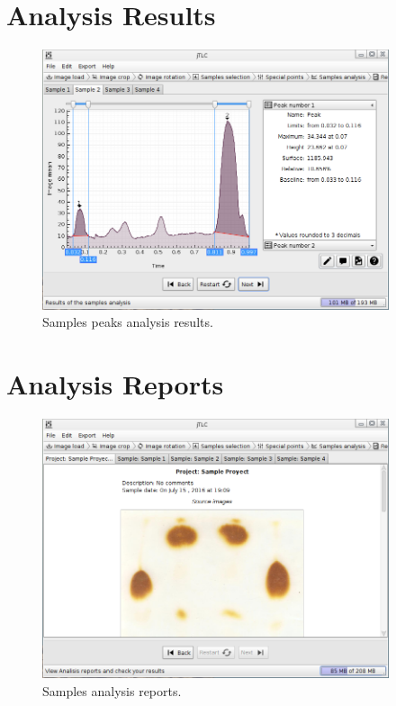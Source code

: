 \section{Analysis Results}
\begin{figure}[H]
	\vspace{0cm}
	\centering
	\includegraphics[width=385px]{imagenes/peaks}
	\centering
	\vspace{-0.4cm}
	\caption{Samples peaks analysis results.}
	\label{fig:image_analysis_results}
	\vspace{-0.25cm}
\end{figure}

\section{Analysis Reports}
\begin{figure}[H]
	\vspace{0cm}
	\centering
	\includegraphics[width=385px]{imagenes/reports}
	\centering
	\vspace{-0.4cm}
	\caption{Samples analysis reports.}
	\label{fig:image_analysis_reports}
	\vspace{-0.25cm}
\end{figure}


